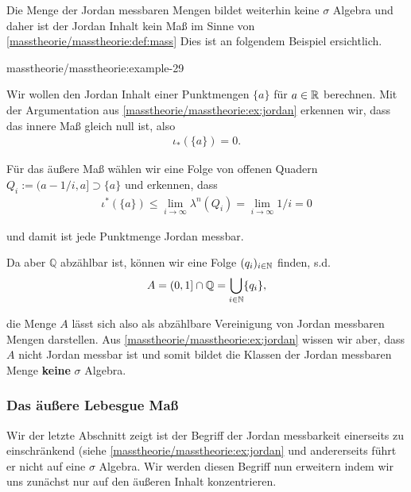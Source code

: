 \par
Die Menge der Jordan messbaren Mengen bildet weiterhin keine \(\sigma\) Algebra und daher ist der Jordan Inhalt kein Maß im Sinne von \cref{masstheorie/masstheorie:def:mass}  Dies ist an folgendem Beispiel ersichtlich.
\begin{example}{}{masstheorie/masstheorie:example-29}



\par
Wir wollen den Jordan Inhalt einer Punktmengen \(\{a\}\) für \(a\in\mathbb{R}\) berechnen. Mit der Argumentation aus \cref{masstheorie/masstheorie:ex:jordan} erkennen wir, dass das innere Maß gleich null ist, also
\begin{align*}
\iota_\ast(\{a\}) = 0.
\end{align*}
\par
Für das äußere Maß wählen wir eine Folge von offenen Quadern \(Q_i:= (a-1/i, a] \supset \{a\}\) und erkennen, dass
\begin{align*}
\iota^\ast(\{a\})\leq \lim_{i\to\infty} \lambda^n(Q_i) = \lim_{i\to\infty} 1/i = 0
\end{align*}
\par
und damit ist jede Punktmenge Jordan messbar.

\par
Da aber \(\mathbb{Q}\) abzählbar ist, können wir eine Folge \((q_i)_{i\in\mathbb{N}}\) finden, s.d.
\begin{align*}
A = (0,1]\cap \mathbb{Q} = \bigcup_{i\in\mathbb{N}} \{q_i\},
\end{align*}
\par
die Menge \(A\) lässt sich also als abzählbare Vereinigung von Jordan messbaren Mengen darstellen. Aus \cref{masstheorie/masstheorie:ex:jordan} wissen wir aber, dass \(A\) nicht Jordan messbar ist und somit bildet die Klassen der Jordan messbaren Menge \textbf{keine} \(\sigma\) Algebra.
\end{example}


\subsubsection{Das äußere Lebesgue Maß}
\label{\detokenize{masstheorie/masstheorie:das-auszere-lebesgue-masz}}
\par
Wir der letzte Abschnitt zeigt ist der Begriff der Jordan messbarkeit einerseits zu einschränkend (siehe \cref{masstheorie/masstheorie:ex:jordan}  und andererseits führt er nicht auf eine \(\sigma\) Algebra. Wir werden diesen Begriff nun erweitern indem wir uns zunächst nur auf den äußeren Inhalt konzentrieren.

